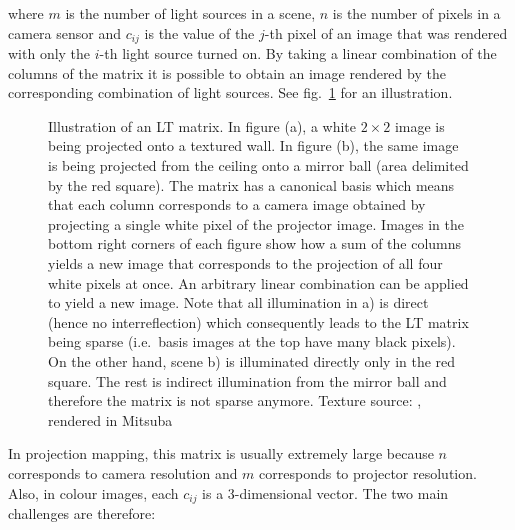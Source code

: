 where \(m\) is the number of light sources in a scene, \(n\) is the number of pixels in a camera sensor and \(c_{ij}\) is the value of the \(j\)-th pixel of an image that was rendered with only the \(i\)-th light source turned on. By taking a linear combination of the columns of the matrix it is possible to obtain an image rendered by the corresponding combination of light sources. See fig.~\ref{fig:background_lt_capture} for an illustration.

\begin{figure}[]
    \centering
    \begin{subfigure}[b]{\textwidth}
        \centering
        \def\svgwidth{\textwidth}
        
        \caption{}
    \end{subfigure}
    
    \begin{subfigure}[b]{\textwidth}
        \centering
        \def\svgwidth{\textwidth}
        
        \caption{}
    \end{subfigure}
    \caption{Illustration of an LT matrix. In figure (a), a white \(2 \times 2\) image is being projected onto a textured wall. In figure (b), the same image is being projected from the ceiling onto a mirror ball (area delimited by the red square). The matrix has a canonical basis which means that each column corresponds to a camera image obtained by projecting a single white pixel of the projector image. Images in the bottom right corners of each figure show how a sum of the columns yields a new image that corresponds to the projection of all four white pixels at once. An arbitrary linear combination can be applied to yield a new image. Note that all illumination in a) is direct (hence no interreflection) which consequently leads to the LT matrix being sparse (i.e.~basis images at the top have many black pixels). On the other hand, scene b) is illuminated directly only in the red square. The rest is indirect illumination from the mirror ball and therefore the matrix is not sparse anymore. Texture source: \citet{Pixar128}, rendered in Mitsuba}
    \label{fig:background_lt_capture}
\end{figure}

In projection mapping, this matrix is usually extremely large because \(n\) corresponds to camera resolution and \(m\) corresponds to projector resolution. Also, in colour images, each \(c_{ij}\) is a 3-dimensional vector. The two main challenges are therefore:

